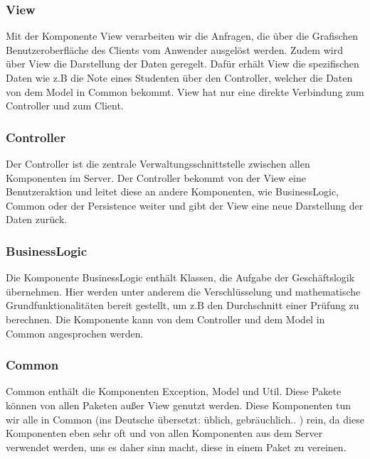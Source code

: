 {\subsubsection{View}
{Mit der Komponente View verarbeiten wir die Anfragen, die über die Grafischen Benutzeroberfläche des Clients vom Anwender ausgelöst werden.
Zudem wird über View die Darstellung der Daten geregelt. Dafür erhält View die spezifischen Daten wie z.B die Note
eines Studenten über den Controller, welcher die Daten von dem Model in Common bekommt. View hat nur eine direkte Verbindung zum Controller und zum Client.}
\subsubsection{Controller}
{Der Controller ist die zentrale Verwaltungsschnittstelle zwischen allen Komponenten im Server. Der Controller bekommt von der View eine Benutzeraktion und leitet diese an andere Komponenten, wie BusinessLogic, Common oder der Persistence weiter und gibt der View eine neue Darstellung der Daten zurück.}
\subsubsection{BusinessLogic}
{Die Komponente BusinessLogic  enthält Klassen, die Aufgabe der Geschäftslogik übernehmen.
Hier werden unter anderem die Verschlüsselung und mathematische Grundfunktionalitäten bereit gestellt, um z.B den Durchschnitt einer Prüfung zu berechnen. Die Komponente kann von dem Controller und dem Model in Common angesprochen werden.
}

\subsubsection{Common}
{ Common enthält die Komponenten Exception, Model und Util. Diese Pakete können von allen Paketen außer View genutzt werden. Diese Komponenten tun wir alle in Common (ins Deutsche übersetzt: üblich, gebräuchlich.. ) rein, da diese Komponenten eben sehr oft und von allen Komponenten aus dem Server verwendet werden, uns es daher sinn macht, diese in einem Paket zu vereinen.
}

}
